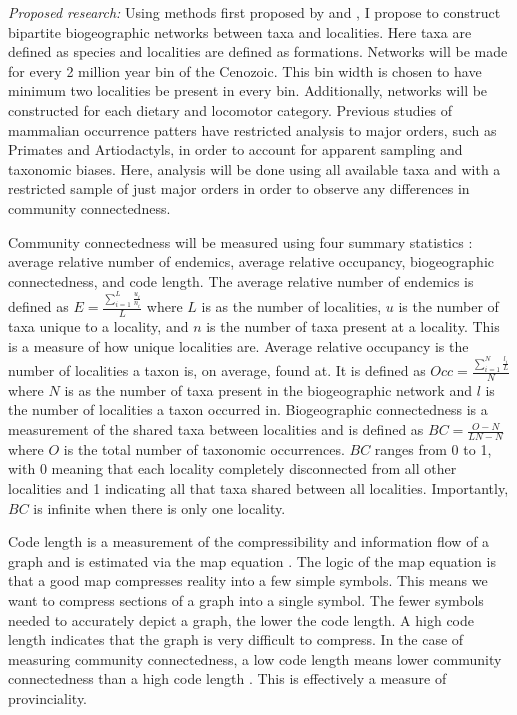 \documentclass[12pt,letterpaper]{article}
\begin{document}
\textit{Proposed research:}
Using methods first proposed by \citet{Sidor2013} and \citet{Vilhena2013}, I propose to construct bipartite biogeographic networks between taxa and localities. Here taxa are defined as species and localities are defined as formations. Networks will be made for every 2 million year bin of the Cenozoic. This bin width is chosen to have minimum two localities be present in every bin. Additionally, networks will be constructed for each dietary and locomotor category. Previous studies of mammalian occurrence patters have restricted analysis to major orders, such as Primates and Artiodactyls, in order to account for apparent sampling and taxonomic biases. Here, analysis will be done using all available taxa and with a restricted sample of just major orders in order to observe any differences in community connectedness.

Community connectedness will be measured using four summary statistics \citep{Sidor2013}: average relative number of endemics, average relative occupancy, biogeographic connectedness, and code length. The average relative number of endemics is defined as 
\(
  E = \frac{\sum_{i = 1}^{L} \frac{u_{i}}{n_{i}}}{L}
\)
where \(L\) is as the number of localities, \(u\) is the number of taxa unique to a locality, and \(n\) is the number of taxa present at a locality. This is a measure of how unique localities are. Average relative occupancy is the number of localities a taxon is, on average, found at. It is defined as 
\(
  Occ = \frac{\sum_{i = 1}^{N} \frac{l_{i}}{L}}{N}
\)
where \(N\) is as the number of taxa present in the biogeographic network and \(l\) is the number of localities a taxon occurred in. Biogeographic connectedness is a measurement of the shared taxa between localities and is defined as 
\(
  BC = \frac{O - N}{LN - N}
\)
where \(O\) is the total number of taxonomic occurrences. \(BC\) ranges from 0 to 1, with 0 meaning that each locality completely disconnected from all other localities and 1 indicating all that taxa shared between all localities. Importantly, \(BC\) is infinite when there is only one locality.

Code length is a measurement of the compressibility and information flow of a graph and is estimated via the map equation \citep{Rosvall2008,Rosvall2010b}. The logic of the map equation is that a good map compresses reality into a few simple symbols. This means we want to compress sections of a graph into a single symbol. The fewer symbols needed to accurately depict a graph, the lower the code length. A high code length indicates that the graph is very difficult to compress. In the case of measuring community connectedness, a low code length means lower community connectedness than a high code length \citep{Sidor2013}. This is effectively a measure of provinciality.
\end{document}
